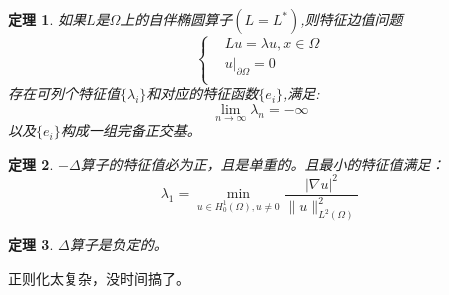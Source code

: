 \documentclass[a4paper]{ctexart}
\newtheorem{Thm}{\hspace{2em}定理}[section]
\begin{document}
\begin{Thm}
    如果$L$是$\Omega$上的自伴椭圆算子$(L=L^{*})$,则特征边值问题
    \begin{equation}
        \left\{
            \begin{aligned}
                &Lu=\lambda u,x\in\Omega\\
                &u|_{\partial\Omega}=0\\
            \end{aligned}
        \right.
    \end{equation}
    存在可列个特征值$\{\lambda_{i}\}$和对应的特征函数$\{e_{i}\}$,满足:
    \begin{equation}
        \lim_{n\rightarrow\infty}\lambda_{n}=-\infty
    \end{equation}
    以及$\{e_{i}\}$构成一组完备正交基。
\end{Thm}
\begin{Thm}
    $-\varDelta$算子的特征值必为正，且是单重的。且最小的特征值满足：
    \begin{equation}
        \lambda_{1}=\min_{u\in H_{0}^{1}(\Omega),u\neq 0}\frac{|\nabla u|^{2}}{\|u\|_{L^{2}(\Omega)}^{2}}
    \end{equation}
\end{Thm}
\begin{Thm}
    $\varDelta$算子是负定的。
\end{Thm}
正则化太复杂，没时间搞了。
\end{document}
